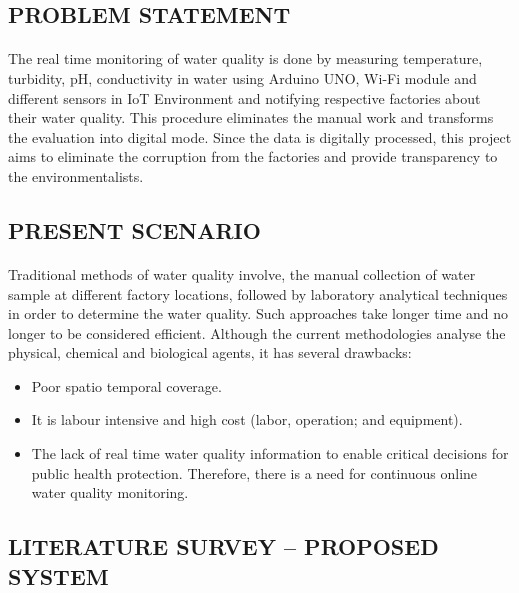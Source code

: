 \subsection{PROBLEM STATEMENT}
\paragraph{}
The real time monitoring of water quality is done by measuring temperature, turbidity, pH, conductivity in water using Arduino UNO, Wi-Fi module and different sensors in IoT Environment and notifying respective factories about their water quality. This procedure eliminates the manual work and transforms the evaluation into digital mode. Since the data is digitally processed, this project aims to eliminate the corruption from the factories and provide transparency to the environmentalists.  

\subsection{PRESENT SCENARIO}
\paragraph{}
Traditional methods of water quality involve, the manual collection of water sample at different factory locations, followed by laboratory analytical techniques in order to determine the water quality. Such approaches take longer time and no longer to be considered efficient. Although the current methodologies analyse the physical, chemical and biological agents, it has several drawbacks: 
\begin{itemize}
\item Poor spatio temporal coverage.
\item It is labour intensive and high cost (labor, operation; and equipment).
\item The lack of real time water quality information to enable critical decisions for public health protection. Therefore, there is a need for continuous online water quality monitoring.
\end{itemize}
\subsection{LITERATURE SURVEY – PROPOSED SYSTEM}
